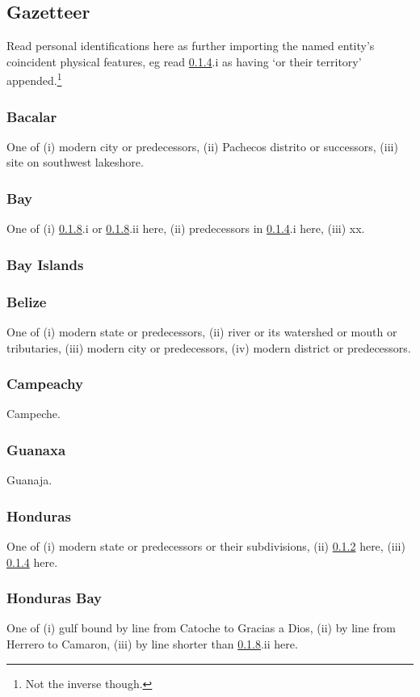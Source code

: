 \documentclass{amsart}
\theoremstyle{definition}%
\theoremstyle{definition}%
\theoremstyle{remark}%
\theoremstyle{definition}%
\theoremstyle{definition}%
\begin{document}
\subsection{Gazetteer} Read personal identifications here as further importing the named entity's coincident physical features, eg read \ref{term:bz}.i as having `or their territory' appended.\footnote{Not the inverse though.}
%
\subsubsection{Bacalar} One of (i) modern city or predecessors, (ii) Pachecos distrito or successors, (iii) site on southwest lakeshore.
%
\subsubsection{Bay}\label{term:bay} One of (i) \ref{term:hondbay}.i or \ref{term:hondbay}.ii here, (ii) predecessors in \ref{term:bz}.i here, (iii) xx.
%
\subsubsection{Bay Islands}
%
\subsubsection{Belize}\label{term:bz} One of (i) modern state or predecessors, (ii) river or its watershed or mouth or tributaries, (iii) modern city or predecessors, (iv) modern district or predecessors.
%
\subsubsection{Campeachy} Campeche.
%
\subsubsection{Guanaxa} Guanaja.%
%
\subsubsection{Honduras} One of (i) modern state or predecessors or their subdivisions, (ii) \ref{term:bay} here, (iii) \ref{term:bz} here.
%
\subsubsection{Honduras Bay}\label{term:hondbay} One of (i) gulf bound by line from Catoche to Gracias a Dios, (ii) by line from Herrero to Camaron, (iii) by line shorter than \ref{term:hondbay}.ii here.
%
\end{document}
